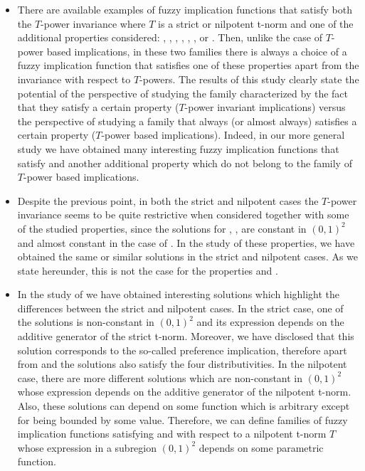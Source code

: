 \begin{itemize}
	\item There are available examples of fuzzy implication functions that satisfy both the $T$-power invariance where $T$ is a strict or nilpotent t-norm and one of the additional properties considered: \IP, \OP, \EP, \LI, \NP, \NPe \IB, \TC or \CB. Then, unlike the case of $T$-power based implications,  in these two families there is always a choice of a fuzzy implication function that satisfies one of these properties apart from the invariance with respect to $T$-powers. The results of this study clearly state the potential of the perspective of studying the family characterized by the fact that they satisfy a certain property ($T$-power invariant implications) versus the perspective of studying a family that always (or almost always) satisfies a certain property ($T$-power based implications). Indeed, in our more general study we have obtained many interesting fuzzy implication functions that satisfy \PIT and another additional property which do not belong to the family of $T$-power based implications.	
	\item Despite the previous point, in both the strict and nilpotent cases the $T$-power invariance seems to be quite restrictive when considered together with some of the studied properties, since the solutions for \LI, \NP, \CB are constant in $(0,1)^2$ and almost constant in the case of \IB. In the study of these properties, we have obtained the same or similar solutions in the strict and nilpotent cases. As we state hereunder, this is not the case for the properties \EP and \TC.
	\item In the study of \EP we have obtained interesting solutions which highlight the differences between the strict and nilpotent cases. In the strict case, one of the solutions is non-constant in $(0,1)^2$ and its expression depends on the additive generator of the strict t-norm. Moreover, we have disclosed that this solution corresponds to the so-called preference implication, therefore apart from \PIT and \EP the solutions also satisfy the four distributivities. In the nilpotent case, there are more different solutions which are non-constant in $(0,1)^2$ whose expression depends on the additive generator of the nilpotent t-norm. Also, these solutions can depend on some function which is arbitrary except for being bounded by some value.  Therefore, we can define families of fuzzy implication functions satisfying \EP and \PIT with respect to a nilpotent t-norm $T$ whose expression in a subregion $(0,1)^2$ depends on some parametric function.

\end{itemize}
